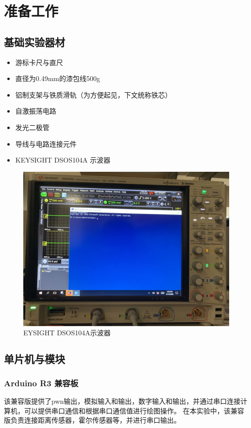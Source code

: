\documentclass[conference]{IEEEtran}
\theoremstyle{break}
\begin{document}
\section{准备工作}

\subsection{基础实验器材}

\begin{itemize}
        \item 游标卡尺与直尺
        \item 直径为0.49mm的漆包线500g
        \item 铝制支架与铁质滑轨（为方便起见，下文统称铁芯）
        \item 自激振荡电路
        \item 发光二极管
        \item 导线与电路连接元件
        \item KEYSIGHT DSOS104A 示波器
\end{itemize}
\begin{figure}[htbp]
        \centerline{\includegraphics[scale=0.1]{示波器.JPG}}
        \caption{EYSIGHT DSOS104A示波器}
        \label{fig}
        \end{figure}
\subsection{单片机与模块}
\subsubsection{Arduino R3 兼容板}
该兼容版提供了pwn输出，模拟输入和输出，数字输入和输出，并通过串口连接计算机，可以提供串口通信和根据串口通信值进行绘图操作。
在本实验中，该兼容版负责连接距离传感器，霍尔传感器等，并进行串口输出。
\end{document}
